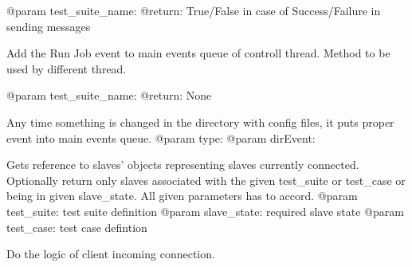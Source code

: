 \documentclass[a4paper,11pt,openany]{sphinxmanual}
\begin{document}
\begin{fulllineitems}
\begin{fulllineitems}
@param test\_suite\_name:
@return: True/False in case of Success/Failure in sending messages

\end{fulllineitems}


\begin{fulllineitems}
\label{ref-manual/XrdTestMaster:XrdTestMaster.XrdTestMaster.fireEnqueueJobEvent}
Add the Run Job event to main events queue of controll thread.
Method to be used by different thread.

@param test\_suite\_name:
@return: None

\end{fulllineitems}


\begin{fulllineitems}
\label{ref-manual/XrdTestMaster:XrdTestMaster.XrdTestMaster.fireReloadDefinitionsEvent}
Any time something is changed in the directory with config files,
it puts proper event into main events queue.
@param type:
@param dirEvent:

\end{fulllineitems}


\begin{fulllineitems}
\label{ref-manual/XrdTestMaster:XrdTestMaster.XrdTestMaster.getSuiteSlaves}
Gets reference to slaves' objects representing slaves currently
connected. Optionally return only slaves associated with the given
test\_suite or test\_case
or being in given slave\_state. All given parameters has to accord.
@param test\_suite: test suite definition
@param slave\_state: required slave state
@param test\_case: test case defintion

\end{fulllineitems}


\begin{fulllineitems}
\label{ref-manual/XrdTestMaster:XrdTestMaster.XrdTestMaster.handleClientConnected}
Do the logic of client incoming connection.


\end{fulllineitems}
\end{fulllineitems}
\end{document}
